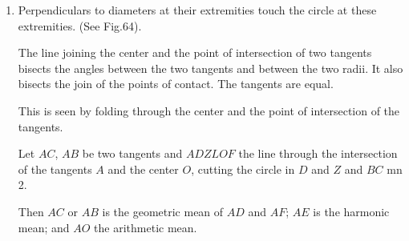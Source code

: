\begin{enumerate}
%
%

\item Perpendiculars to diameters at their extremities touch the circle at these
    extremities. (See Fig.64).


    The line joining the center and the point of intersection of two tangents
    bisects the angles between the two tangents and between the two radii.  It
    also bisects the join of the points of contact. The tangents are equal.

    This is seen by folding through the center and the point of intersection of
    the tangents.

    Let $AC$, $AB$ be two tangents and $ADZLOF$ the line through the 
    intersection of the tangents $A$ and the center $O$, cutting the circle in
    $D$ and $Z$ and $BC$ mn 2.

    Then $AC$ or $AB$ is the geometric mean of $AD$ and $AF$; $AE$ is the
    harmonic mean; and $AO$ the arithmetic mean.


\end{enumerate}
